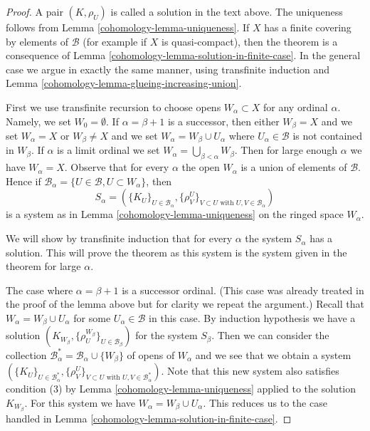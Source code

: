 \begin{proof}

A pair $(K, \rho_U)$ is called a solution in the text above.
The uniqueness follows from Lemma \ref{cohomology-lemma-uniqueness}.
If $X$ has a finite covering by elements of $\mathcal{B}$
(for example if $X$ is quasi-compact), then the theorem
is a consequence of Lemma \ref{cohomology-lemma-solution-in-finite-case}.
In the general case we argue in exactly the same manner,
using transfinite induction and
Lemma \ref{cohomology-lemma-glueing-increasing-union}.

\medskip\noindent
First we use transfinite recursion to choose opens $W_\alpha \subset X$
for any ordinal $\alpha$. Namely, we set $W_0 = \emptyset$.
If $\alpha = \beta + 1$ is a successor, then either $W_\beta = X$
and we set $W_\alpha = X$ or $W_\beta \not = X$ and we set
$W_\alpha = W_\beta \cup U_\alpha$ where
$U_\alpha \in \mathcal{B}$ is not contained in $W_\beta$.
If $\alpha$ is a limit ordinal we set
$W_\alpha = \bigcup_{\beta < \alpha} W_\beta$.
Then for large enough $\alpha$ we have $W_\alpha = X$.
Observe that for every $\alpha$ the open $W_\alpha$ is
a union of elements of $\mathcal{B}$. Hence if
$\mathcal{B}_\alpha = \{U \in \mathcal{B}, U \subset W_\alpha\}$, then
$$
S_\alpha = (\{K_U\}_{U \in \mathcal{B}_\alpha},
\{\rho_V^U\}_{V \subset U\text{ with }U, V \in \mathcal{B}_\alpha})
$$
is a system as in Lemma \ref{cohomology-lemma-uniqueness} on the ringed space $W_\alpha$.

\medskip\noindent
We will show by transfinite induction that for every $\alpha$
the system $S_\alpha$ has a solution. This will prove the theorem
as this system is the system given in the theorem for large $\alpha$.

\medskip\noindent
The case where $\alpha = \beta + 1$ is a successor ordinal.
(This case was already treated in the proof of the lemma above
but for clarity we repeat the argument.)
Recall that $W_\alpha = W_\beta \cup U_\alpha$ for some
$U_\alpha \in \mathcal{B}$ in this case.
By induction hypothesis we have a solution
$(K_{W_\beta}, \{\rho^{W_\beta}_U\}_{U \in \mathcal{B}_\beta})$
for the system $S_\beta$.
Then we can consider the collection
$\mathcal{B}_\alpha^* = \mathcal{B}_\alpha \cup \{W_\beta\}$
of opens of $W_\alpha$ and we see that we obtain a system
$(\{K_U\}_{U \in \mathcal{B}_\alpha^*},
\{\rho_V^U\}_{V \subset U\text{ with }U, V \in \mathcal{B}_\alpha^*})$.
Note that this new system also satisfies condition (3)
by Lemma \ref{cohomology-lemma-uniqueness} applied to the solution $K_{W_\beta}$.
For this system we have $W_\alpha = W_\beta \cup U_\alpha$.
This reduces us to the case handled in
Lemma \ref{cohomology-lemma-solution-in-finite-case}.


\end{proof}
